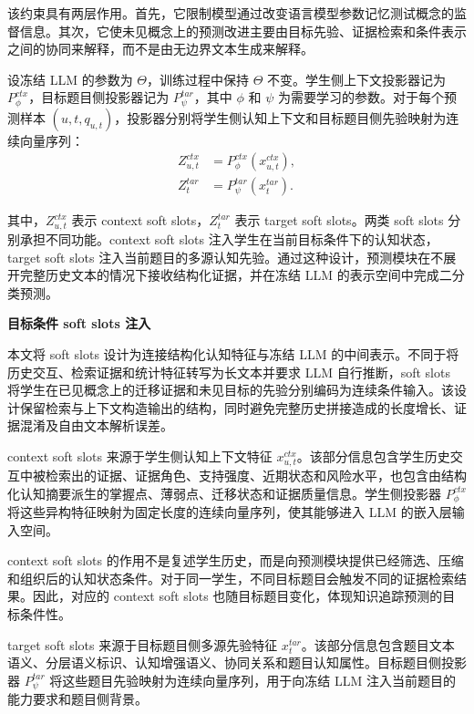 \documentclass[UTF8,a4paper,12pt]{ctexart}
\numberwithin{table}{section}
\begin{document}
该约束具有两层作用。首先，它限制模型通过改变语言模型参数记忆测试概念的监督信息。其次，它使未见概念上的预测改进主要由目标先验、证据检索和条件表示之间的协同来解释，而不是由无边界文本生成来解释。

设冻结 LLM 的参数为 \(\Theta\)，训练过程中保持 \(\Theta\) 不变。学生侧上下文投影器记为 \(P_{\phi}^{ctx}\)，目标题目侧投影器记为 \(P_{\psi}^{tar}\)，其中 \(\phi\) 和 \(\psi\) 为需要学习的参数。对于每个预测样本 \((u,t,q_{u,t})\)，投影器分别将学生侧认知上下文和目标题目侧先验映射为连续向量序列：
\begin{align}
Z^{ctx}_{u,t} &= P_{\phi}^{ctx}(x^{ctx}_{u,t}), \\
Z^{tar}_{t} &= P_{\psi}^{tar}(x^{tar}_{t}).
\end{align}

其中，\(Z^{ctx}_{u,t}\) 表示 context soft slots，\(Z^{tar}_{t}\) 表示 target soft slots。两类 soft slots 分别承担不同功能。context soft slots 注入学生在当前目标条件下的认知状态，target soft slots 注入当前题目的多源认知先验。通过这种设计，预测模块在不展开完整历史文本的情况下接收结构化证据，并在冻结 LLM 的表示空间中完成二分类预测。

\noindent\textbf{目标条件 soft slots 注入}



本文将 soft slots 设计为连接结构化认知特征与冻结 LLM 的中间表示。不同于将历史交互、检索证据和统计特征转写为长文本并要求 LLM 自行推断，soft slots 将学生在已见概念上的迁移证据和未见目标的先验分别编码为连续条件输入。该设计保留检索与上下文构造输出的结构，同时避免完整历史拼接造成的长度增长、证据混淆及自由文本解析误差。

context soft slots 来源于学生侧认知上下文特征 \(x^{ctx}_{u,t}\)。该部分信息包含学生历史交互中被检索出的证据、证据角色、支持强度、近期状态和风险水平，也包含由结构化认知摘要派生的掌握点、薄弱点、迁移状态和证据质量信息。学生侧投影器 \(P_{\phi}^{ctx}\) 将这些异构特征映射为固定长度的连续向量序列，使其能够进入 LLM 的嵌入层输入空间。

context soft slots 的作用不是复述学生历史，而是向预测模块提供已经筛选、压缩和组织后的认知状态条件。对于同一学生，不同目标题目会触发不同的证据检索结果。因此，对应的 context soft slots 也随目标题目变化，体现知识追踪预测的目标条件性。

target soft slots 来源于目标题目侧多源先验特征 \(x^{tar}_{t}\)。该部分信息包含题目文本语义、分层语义标识、认知增强语义、协同关系和题目认知属性。目标题目侧投影器 \(P_{\psi}^{tar}\) 将这些题目先验映射为连续向量序列，用于向冻结 LLM 注入当前题目的能力要求和题目侧背景。
\end{document}
